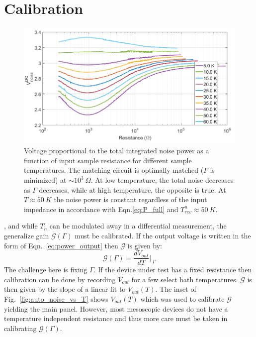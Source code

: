 \section{Calibration}
\label{section:calibration}
\begin{figure}
\centering
\includegraphics[width=120mm]{figures/Johnson_noise_thermometry/Vn_vs_R.png}
\caption{Voltage proportional to the total integrated noise power as a function of input sample resistance for different sample temperatures. The matching circuit is optimally matched ($\Gamma$ is minimized) at ${\sim}10^3~\Omega$. At low temperature, the total noise decreases as $\Gamma$ decreases, while at high temperature, the opposite is true. At $T\approx50~K$ the noise power is constant regardless of the input impedance in accordance with Eqn.\ref{eq:P_full} and $T_{rev}^n\approx50~K$.}
\label{fig:JNT_Vn_vs_R}
\end{figure}
, and while $T_n$ can be modulated away in a differential measurement, the generalize gain $\mathcal{G}(\Gamma)$ must be calibrated. If the output voltage is written in the form of Eqn.~\ref{eq:power_output} then $\mathcal{G}$ is given by:
\begin{equation}
\mathcal{G}(\Gamma) = \frac{dV_{out}}{dT}\bigg\rvert_{~\Gamma}
\end{equation}
The challenge here is fixing $\Gamma$. If the device under test has a fixed resistance then calibration can be done by recording $V_{out}$ for a few select bath temperatures. $\mathcal{G}$ is then given by the slope of a linear fit to $V_{out}(T)$. The inset of Fig.~\ref{fig:auto_noise_vs_T} shows $V_{out}(T)$ which was used to calibrate $\mathcal{G}$ yielding the main panel. However, most mesoscopic devices do not have a temperature independent resistance and thus more care must be taken in calibrating $\mathcal{G}(\Gamma)$.
